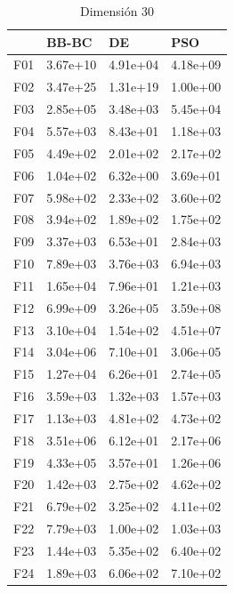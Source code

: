 \begin{table}[H]
\begin{minipage}{.5\linewidth}
    \end{minipage}%
    \begin{minipage}{.5\linewidth}
      \centering
        \caption{Dimensión 30}
        \begin{tabular}{llll}
            \toprule
            {} &     BB-BC &        DE &       PSO \\
            \midrule
            F01  &  3.67e+10 &  4.91e+04 &  4.18e+09 \\
            F02  &  3.47e+25 &  1.31e+19 &  1.00e+00 \\
            F03  &  2.85e+05 &  3.48e+03 &  5.45e+04 \\
            F04  &  5.57e+03 &  8.43e+01 &  1.18e+03 \\
            F05  &  4.49e+02 &  2.01e+02 &  2.17e+02 \\
            F06  &  1.04e+02 &  6.32e+00 &  3.69e+01 \\
            F07  &  5.98e+02 &  2.33e+02 &  3.60e+02 \\
            F08  &  3.94e+02 &  1.89e+02 &  1.75e+02 \\
            F09  &  3.37e+03 &  6.53e+01 &  2.84e+03 \\
            F10  &  7.89e+03 &  3.76e+03 &  6.94e+03 \\
            F11  &  1.65e+04 &  7.96e+01 &  1.21e+03 \\
            F12  &  6.99e+09 &  3.26e+05 &  3.59e+08 \\
            F13  &  3.10e+04 &  1.54e+02 &  4.51e+07 \\
            F14  &  3.04e+06 &  7.10e+01 &  3.06e+05 \\
            F15  &  1.27e+04 &  6.26e+01 &  2.74e+05 \\
            F16  &  3.59e+03 &  1.32e+03 &  1.57e+03 \\
            F17  &  1.13e+03 &  4.81e+02 &  4.73e+02 \\
            F18  &  3.51e+06 &  6.12e+01 &  2.17e+06 \\
            F19  &  4.33e+05 &  3.57e+01 &  1.26e+06 \\
            F20  &  1.42e+03 &  2.75e+02 &  4.62e+02 \\
            F21  &  6.79e+02 &  3.25e+02 &  4.11e+02 \\
            F22  &  7.79e+03 &  1.00e+02 &  1.03e+03 \\
            F23  &  1.44e+03 &  5.35e+02 &  6.40e+02 \\
            F24  &  1.89e+03 &  6.06e+02 &  7.10e+02 \\

\end{tabular}
\end{minipage}
\end{table}
